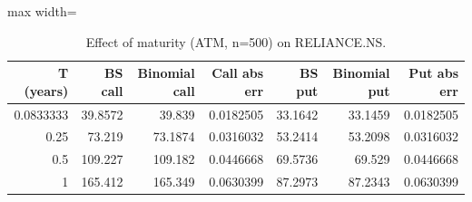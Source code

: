 \begin{table}
\centering
\small
\caption{Effect of maturity (ATM, n=500) on RELIANCE.NS.}
\label{tab:e5_maturity}
\begin{adjustbox}{max width=\textwidth}
\begin{tabular}{rrrrrrr}
\toprule
T (years) & BS call & Binomial call & Call abs err & BS put & Binomial put & Put abs err \\
\midrule
0.0833333 & 39.8572 & 39.839 & 0.0182505 & 33.1642 & 33.1459 & 0.0182505 \\
0.25 & 73.219 & 73.1874 & 0.0316032 & 53.2414 & 53.2098 & 0.0316032 \\
0.5 & 109.227 & 109.182 & 0.0446668 & 69.5736 & 69.529 & 0.0446668 \\
1 & 165.412 & 165.349 & 0.0630399 & 87.2973 & 87.2343 & 0.0630399 \\
\bottomrule
\end{tabular}
\end{adjustbox}
\end{table}
